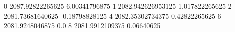 0 2087.92822265625 6.00341796875
1 2082.942626953125 1.017822265625
2 2081.73681640625 -0.18798828125
4 2082.35302734375 0.42822265625
6 2081.9248046875 0.0
8 2081.9912109375 0.06640625
